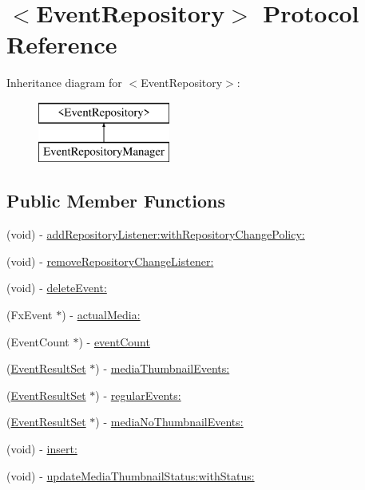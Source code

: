 \hypertarget{protocol_event_repository-p}{
\section{$<$\-Event\-Repository$>$ \-Protocol \-Reference}
\label{protocol_event_repository-p}
}
\-Inheritance diagram for $<$\-Event\-Repository$>$\-:\begin{figure}[H]
\begin{center}
\leavevmode
\includegraphics[height=2.000000cm]{protocol_event_repository-p}
\end{center}
\end{figure}
\subsection*{\-Public \-Member \-Functions}
\begin{DoxyCompactItemize}
\item 
(void) -\/ \hyperlink{protocol_event_repository-p_a25f0a35ced41baf3ce82d51d84e38b51}{add\-Repository\-Listener\-:with\-Repository\-Change\-Policy\-:}
\item 
(void) -\/ \hyperlink{protocol_event_repository-p_a7315a76f63bfbb05e97520625d37a881}{remove\-Repository\-Change\-Listener\-:}
\item 
(void) -\/ \hyperlink{protocol_event_repository-p_a91aeec9b77ff9944ac01c99c4e98c343}{delete\-Event\-:}
\item 
(\-Fx\-Event $\ast$) -\/ \hyperlink{protocol_event_repository-p_a964deaf778c6c5a13c2159fb611ba9ef}{actual\-Media\-:}
\item 
(\-Event\-Count $\ast$) -\/ \hyperlink{protocol_event_repository-p_ac8985019b228cc69e1678ccce9cdc0a2}{event\-Count}
\item 
(\hyperlink{interface_event_result_set}{\-Event\-Result\-Set} $\ast$) -\/ \hyperlink{protocol_event_repository-p_a83cb2e0a3ab02c7cc56e868833aabbdb}{media\-Thumbnail\-Events\-:}
\item 
(\hyperlink{interface_event_result_set}{\-Event\-Result\-Set} $\ast$) -\/ \hyperlink{protocol_event_repository-p_a195d8d6ac1176f6ca04e64335bb89fad}{regular\-Events\-:}
\item 
(\hyperlink{interface_event_result_set}{\-Event\-Result\-Set} $\ast$) -\/ \hyperlink{protocol_event_repository-p_a9278b47ac4217e45808c21cd86698c47}{media\-No\-Thumbnail\-Events\-:}
\item 
(void) -\/ \hyperlink{protocol_event_repository-p_ac6d61a7e595aea2098bd96bc603b6087}{insert\-:}
\item 
(void) -\/ \hyperlink{protocol_event_repository-p_a727c213748a4470b2056d1f5b0931c9d}{update\-Media\-Thumbnail\-Status\-:with\-Status\-:}
\end{DoxyCompactItemize}


